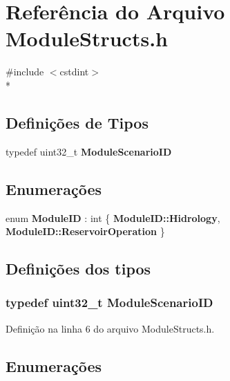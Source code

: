 \section{Referência do Arquivo Module\+Structs.\+h}
\label{_module_structs_8h}
{\ttfamily \#include $<$cstdint$>$}\\*
\subsection*{Definições de Tipos}
\begin{DoxyCompactItemize}
\item 
typedef uint32\+\_\+t {\bf Module\+Scenario\+ID}
\end{DoxyCompactItemize}
\subsection*{Enumerações}
\begin{DoxyCompactItemize}
\item 
enum {\bf Module\+ID} \+: int \{ {\bf Module\+I\+D\+::\+Hidrology}, 
{\bf Module\+I\+D\+::\+Reservoir\+Operation}
 \}
\end{DoxyCompactItemize}


\subsection{Definições dos tipos}
\subsubsection[{Module\+Scenario\+ID}]{\setlength{\rightskip}{0pt plus 5cm}typedef uint32\+\_\+t {\bf Module\+Scenario\+ID}}\label{_module_structs_8h_a5d3773d12296ed3c0f23feb030dc3c8b}


Definição na linha 6 do arquivo Module\+Structs.\+h.



\subsection{Enumerações}
